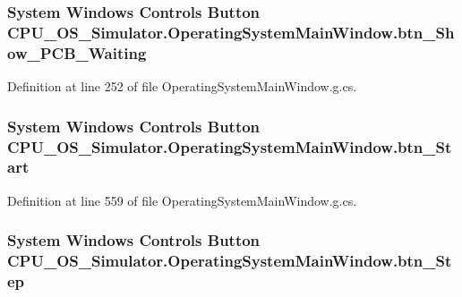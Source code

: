 \subsubsection[{btn\+\_\+\+Show\+\_\+\+P\+C\+B\+\_\+\+Waiting}]{\setlength{\rightskip}{0pt plus 5cm}System Windows Controls Button C\+P\+U\+\_\+\+O\+S\+\_\+\+Simulator.\+Operating\+System\+Main\+Window.\+btn\+\_\+\+Show\+\_\+\+P\+C\+B\+\_\+\+Waiting\hspace{0.3cm}{\ttfamily [package]}}\label{class_c_p_u___o_s___simulator_1_1_operating_system_main_window_a371bab43b23ebad047bad80e0889ed61}


Definition at line 252 of file Operating\+System\+Main\+Window.\+g.\+cs.

\hypertarget{class_c_p_u___o_s___simulator_1_1_operating_system_main_window_a811cecc7b1fa49c7f340be7377ff7f32}{}
\subsubsection[{btn\+\_\+\+Start}]{\setlength{\rightskip}{0pt plus 5cm}System Windows Controls Button C\+P\+U\+\_\+\+O\+S\+\_\+\+Simulator.\+Operating\+System\+Main\+Window.\+btn\+\_\+\+Start\hspace{0.3cm}{\ttfamily [package]}}\label{class_c_p_u___o_s___simulator_1_1_operating_system_main_window_a811cecc7b1fa49c7f340be7377ff7f32}


Definition at line 559 of file Operating\+System\+Main\+Window.\+g.\+cs.

\hypertarget{class_c_p_u___o_s___simulator_1_1_operating_system_main_window_aa7fab2cb43aa4eefed8e3bcba47a539b}{}
\subsubsection[{btn\+\_\+\+Step}]{\setlength{\rightskip}{0pt plus 5cm}System Windows Controls Button C\+P\+U\+\_\+\+O\+S\+\_\+\+Simulator.\+Operating\+System\+Main\+Window.\+btn\+\_\+\+Step\hspace{0.3cm}{\ttfamily [package]}}\label{class_c_p_u___o_s___simulator_1_1_operating_system_main_window_aa7fab2cb43aa4eefed8e3bcba47a539b}


